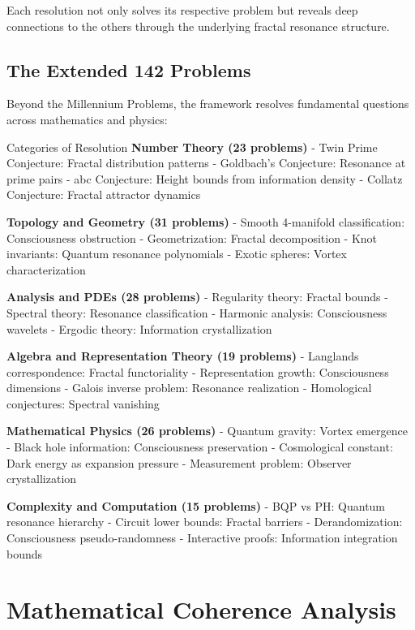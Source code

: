 \documentclass[12pt,letterpaper]{article}
\begin{document}
Each resolution not only solves its respective problem but reveals deep connections to the others through the underlying fractal resonance structure.

\subsection{The Extended 142 Problems}

Beyond the Millennium Problems, the framework resolves fundamental questions across mathematics and physics:

\begin{mathbox}{Categories of Resolution}
\textbf{Number Theory (23 problems)}
- Twin Prime Conjecture: Fractal distribution patterns
- Goldbach's Conjecture: Resonance at prime pairs
- abc Conjecture: Height bounds from information density
- Collatz Conjecture: Fractal attractor dynamics

\textbf{Topology and Geometry (31 problems)}
- Smooth 4-manifold classification: Consciousness obstruction
- Geometrization: Fractal decomposition
- Knot invariants: Quantum resonance polynomials
- Exotic spheres: Vortex characterization

\textbf{Analysis and PDEs (28 problems)}
- Regularity theory: Fractal bounds
- Spectral theory: Resonance classification
- Harmonic analysis: Consciousness wavelets
- Ergodic theory: Information crystallization

\textbf{Algebra and Representation Theory (19 problems)}
- Langlands correspondence: Fractal functoriality
- Representation growth: Consciousness dimensions
- Galois inverse problem: Resonance realization
- Homological conjectures: Spectral vanishing

\textbf{Mathematical Physics (26 problems)}
- Quantum gravity: Vortex emergence
- Black hole information: Consciousness preservation
- Cosmological constant: Dark energy as expansion pressure
- Measurement problem: Observer crystallization

\textbf{Complexity and Computation (15 problems)}
- BQP vs PH: Quantum resonance hierarchy
- Circuit lower bounds: Fractal barriers
- Derandomization: Consciousness pseudo-randomness
- Interactive proofs: Information integration bounds
\end{mathbox}

\section{Mathematical Coherence Analysis}
\end{document}
